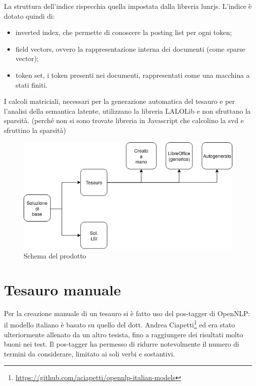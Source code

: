 La struttura dell'indice rispecchia quella impostata dalla libreria lunrjs. L'indice è dotato quindi di:
\begin{itemize}
    \item inverted index, che permette di conoscere la posting list per ogni token;
    \item field vectors, ovvero la rappresentazione interna dei documenti (come sparse vector);
    \item token set, i token presenti nei documenti, rappresentati come una macchina a stati finiti.
\end{itemize}
 
I calcoli matriciali, necessari per la generazione automatica del tesauro e per l'analisi della semantica latente, utilizzano la libreria LALOLib e non sfruttano la sparsità. (perché non si sono trovate libreria in Javascript che calcolino la \gls{svd} e sfruttino la sparsità) 

\begin{figure}
    \includegraphics[scale=0.6]{immagini/schema-soluzione.png}
    \caption{Schema del prodotto}
    \label{fig:schemaProdotto}
 \end{figure}


\section{Tesauro manuale}
Per la creazione manuale di un tesauro si è fatto uso del \gls{pos-tagger} di OpenNLP: il modello italiano è basato su quello del dott. Andrea Ciapetti\footnote{\url{https://github.com/aciapetti/opennlp-italian-models}} ed era stato ulteriormente allenato da un altro tesista, fino a raggiungere dei risultati molto buoni nei test. Il \gls{pos-tagger} ha permesso di ridurre notevolmente il numero di termini da considerare, limitato ai soli verbi e sostantivi.

